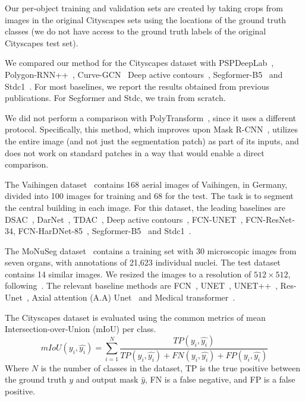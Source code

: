 \documentclass[10pt,twocolumn,letterpaper]{article}
\begin{document}
Our per-object training and validation sets are created by taking crops from images in the original Cityscapes sets using the locations of the ground truth classes (we do not have access to the ground truth labels of the original Cityscapes test set).

We compared our method for the Cityscapes dataset with PSPDeepLab~\cite{chen2017deeplab},  Polygon-RNN++~\cite{acuna2018efficient},  Curve-GCN~\cite{ling2019fast} Deep active contours~\cite{gur2019end}, Segformer-B5~\cite{xie2021segformer} and Stdc1~\cite{fan2021rethinking}. For most baselines, we report the results obtained from previous publications. For Segformer and Stdc, we train from scratch. 

We did not perform a comparison with PolyTransform~\cite{liang2020polytransform}, since it uses a different protocol. Specifically, this method, which improves upon Mask R-CNN~\cite{he2017mask}, utilizes the entire image (and not just the segmentation patch) as part of its inputs, and does not work on standard patches in a way that would enable a direct comparison.

The Vaihingen dataset~\cite{rottensteiner2014isprs} contains 168 aerial images of Vaihingen, in Germany, divided into 100 images for training and 68 for the test. The task is to segment the central building in each image. For this dataset, the leading baselines are DSAC~\cite{marcos2018learning}, DarNet~\cite{cheng2019darnet}, TDAC~\cite{hatamizadeh2020end}, Deep active contours~\cite{gur2019end}, FCN-UNET~\cite{ronneberger2015u}, FCN-ResNet-34, FCN-HarDNet-85~\cite{chao2019hardnet}, Segformer-B5~\cite{xie2021segformer} and Stdc1~\cite{fan2021rethinking}.

The MoNuSeg dataset~\cite{kumar2019multi,kumar2017dataset} contains a training set with 30 microscopic images from seven organs, with annotations of 21,623 individual nuclei. The test dataset contains 14 similar images. We resized the images to a resolution of $512\times 512$, following~\cite{valanarasu2021medical}. The relevant baseline methods are FCN~\cite{badrinarayanan2017segnet}, UNET~\cite{ronneberger2015u},  UNET++~\cite{zhou2018unet++}, Res-Unet~\cite{xiao2018weighted}, Axial attention (A.A) Unet~\cite{wang2020axial} and Medical transformer~\cite{valanarasu2021medical}.

The Cityscapes dataset is evaluated using the common metrics of mean Intersection-over-Union (mIoU) per class.
\begin{equation}
mIoU(y_i,\hat{y_i}) =  \sum_{i=1}^N \frac{TP(y_i,\hat{y_i})}{TP(y_i,\hat{y_i}) + FN(y_i,\hat{y_i}) + FP(y_i,\hat{y_i})}
\end{equation}
Where $N$ is the number of classes in the dataset, TP is the true positive between the ground truth $y$ and output mask $\hat{y}$, FN is a false negative, and FP is a false positive.
\end{document}
